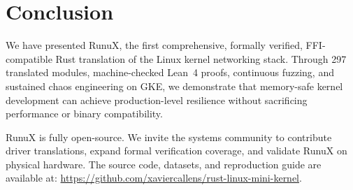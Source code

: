 \documentclass[sigconf,nonacm=false]{acmart}
\begin{document}
\section{Conclusion}
\label{sec:conclusion}

We have presented RunuX, the first comprehensive, formally verified, FFI-compatible Rust translation of the Linux kernel networking stack. Through 297 translated modules, machine-checked Lean~4 proofs, continuous fuzzing, and sustained chaos engineering on GKE, we demonstrate that memory-safe kernel development can achieve production-level resilience without sacrificing performance or binary compatibility.

RunuX is fully open-source. We invite the systems community to contribute driver translations, expand formal verification coverage, and validate RunuX on physical hardware. The source code, datasets, and reproduction guide are available at: \url{https://github.com/xaviercallens/rust-linux-mini-kernel}.
\end{document}
